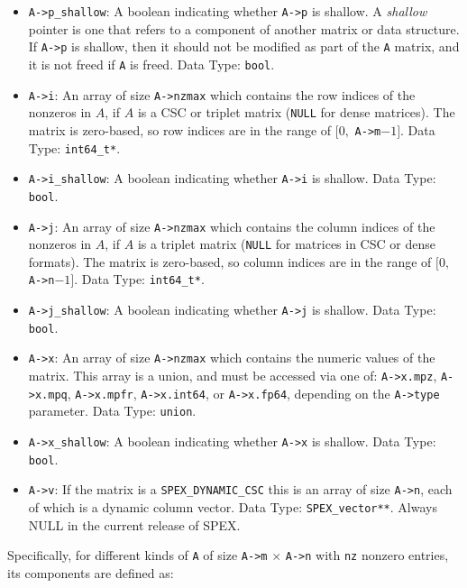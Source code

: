 \documentclass[12pt,oneside]{book}
\theoremstyle{definition}
\begin{document}
\begin{itemize}
    \item \verb|A->p_shallow|: A boolean indicating whether \verb|A->p| is shallow. A {\em shallow} pointer is one that refers to a component of another matrix or data structure.  If \verb|A->p| is shallow, then it should not be modified as part of the \verb|A| matrix, and it is not freed if \verb|A| is freed. Data Type: \verb|bool|.

    \item \verb|A->i|: An array of size \verb|A->nzmax| which contains the row indices of the nonzeros in $A$, if $A$ is a CSC or triplet matrix (\verb|NULL| for dense matrices). The matrix is zero-based, so row indices are in the range of $[0,$ \verb|A->m|$-1]$. Data Type: \verb|int64_t*|.

    \item \verb|A->i_shallow|: A boolean indicating whether \verb|A->i| is shallow. Data Type: \verb|bool|.

    \item \verb|A->j|: An array of size \verb|A->nzmax| which contains the column indices of the nonzeros in $A$, if $A$ is a triplet matrix (\verb|NULL| for matrices in CSC or dense formats). The matrix is zero-based, so column indices are in the range of $[0,$ \verb|A->n|$-1]$. Data Type: \verb|int64_t*|.

    \item \verb|A->j_shallow|: A boolean indicating whether \verb|A->j| is shallow. Data Type: \verb|bool|.

    \item \verb|A->x|: An array of size \verb|A->nzmax| which contains the numeric values of the matrix.  This array is a union, and must be accessed via one of: \verb|A->x.mpz|, \verb|A->x.mpq|, \verb|A->x.mpfr|, \verb|A->x.int64|, or \verb|A->x.fp64|, depending on the \verb|A->type| parameter. Data Type: \verb|union|.

    \item \verb|A->x_shallow|: A boolean indicating whether \verb|A->x| is shallow. Data Type: \verb|bool|.

    \item \verb|A->v|: If the matrix is a \verb|SPEX_DYNAMIC_CSC| this is an array of size \verb|A->n|, each of which is a dynamic column vector. Data Type: \verb|SPEX_vector**|. Always NULL in the current release of SPEX.
\end{itemize}

Specifically, for different kinds of \verb|A| of size \verb|A->m| $\times$ \verb|A->n|
with \verb|nz| nonzero entries, its components are defined as:
\end{document}
